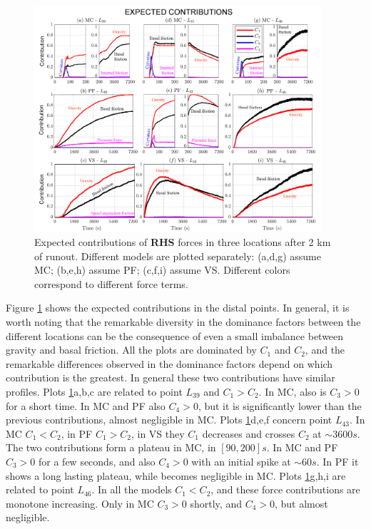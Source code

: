 \documentclass{article}
\begin{document}
\begin{figure}[H]
         \centering
        \includegraphics[width=0.95\textwidth]{figures/Colima/Ci2_total.png}
        \caption{Expected contributions of \textbf{RHS} forces in three locations after 2 km of runout. Different models are plotted separately: (a,d,g) assume MC; (b,e,h) assume PF; (c,f,i) assume VS. Different colors correspond to different force terms.}
        \label{fig:Colima-Ci_2}
\end{figure}
Figure \ref{fig:Colima-Ci_2} shows the expected contributions in the distal points. In general, it is worth noting that the remarkable diversity in the dominance factors between the different locations can be the consequence of even a small imbalance between gravity and basal friction. All the plots are dominated by $C_1$ and $C_2$, and the remarkable differences observed in the dominance factors depend on which contribution is the greatest. In general these two contributions have similar profiles. Plots \ref{fig:Colima-Ci_2}a,b,c are related to point $L_{39}$ and $C_1>C_2$. In MC, also is $C_3>0$ for a short time. In MC and PF also $C_4>0$, but it is significantly lower than the previous contributions, almost negligible in MC. Plots \ref{fig:Colima-Ci_2}d,e,f concern point $L_{43}$. In MC $C_1<C_2$, in PF $C_1>C_2$, in VS they $C_1$ decreases and crosses $C_2$ at $\sim 3600 s$. The two contributions form a plateau in MC, in $[90, 200] s$. In MC and PF $C_3>0$ for a few seconds, and also $C_4>0$ with an initial spike at $\sim 60s$. In PF it shows a long lasting plateau, while becomes negligible in MC. Plots \ref{fig:Colima-Ci_2}g,h,i are related to point $L_{46}$. In all the models $C_1<C_2$, and these force contributions are monotone increasing. Only in MC $C_3>0$ shortly, and $C_4>0$, but almost negligible.
\end{document}
